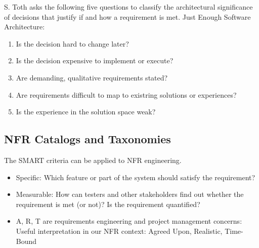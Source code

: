 \documentclass[../Main.tex]{subfiles}
\begin{document}
S. Toth asks the following five questions to classify the architectural significance of decisions that justify if and
how a requirement is met.
Just Enough Software Architecture:
\begin{enumerate}
    \item Is the decision hard to change later?
    \item Is the decision expensive to implement or execute?
    \item Are demanding, qualitative requirements stated?
    \item Are requirements difficult to map to existring solutions or experiences?
    \item Is the experience in the solution space weak?
\end{enumerate}

\subsection{NFR Catalogs and Taxonomies}


The SMART criteria can be applied to NFR engineering.
\begin{itemize}
    \item Specific: Which feature or part of the system should satisfy the requirement?
    \item Measurable: How can testers and other stakeholders find out whether the requirement is met (or not)? Is the requirement quantified?
    \item A, R, T are requirements engineering and project management concerns: Useful interpretation in our NFR context: Agreed Upon, Realistic, Time-Bound
\end{itemize}
\end{document}
